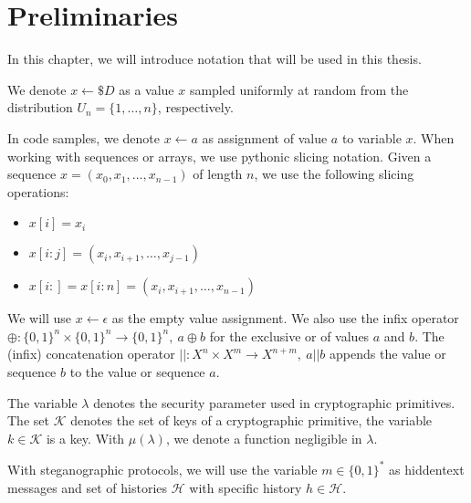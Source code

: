 \chapter{Preliminaries}
In this chapter, we will introduce notation that will be used in this thesis.

We denote $x \leftarrow\$ D$ as a value $x$ sampled uniformly at random from the distribution $U_n = \{ 1, \dots, n \}$, respectively. 

In code samples, we denote $x \leftarrow a$ as assignment of value $a$ to variable $x$.
When working with sequences or arrays, we use pythonic slicing notation.
Given a sequence $x = (x_0, x_1, \dots, x_{n-1})$ of length $n$, we use the following slicing operations:

\begin{itemize}
	\item $x[i] = x_i$
	\item $x[i:j] = (x_i, x_{i+1}, \dots, x_{j-1})$
	\item $x[i:] = x[i:n] = (x_i, x_{i+1}, \dots, x_{n-1})$
\end{itemize}

We will use $x \leftarrow \epsilon$ as the empty value assignment.
We also use the infix operator $\oplus \colon \{0,1\}^n \times \{0,1\}^n \rightarrow \{0,1\}^n,~ a \oplus b$ for the exclusive or of values $a$ and $b$.
The (infix) concatenation operator $|| \colon X^n \times X^m \rightarrow X^{n+m},~ a||b$ appends the value or sequence $b$ to the value or sequence $a$. 

The variable $\lambda$ denotes the security parameter used in cryptographic primitives.
The set $\mathcal{K}$ denotes the set of keys of a cryptographic primitive, the variable $k \in \mathcal{K}$ is a key.
With $\mu(\lambda)$, we denote a function negligible in $\lambda$.

With steganographic protocols, we will use the variable $m \in \{0,1\}^*$ as hiddentext messages and set of histories $\mathcal{H}$ with specific history $h \in \mathcal{H}$.
